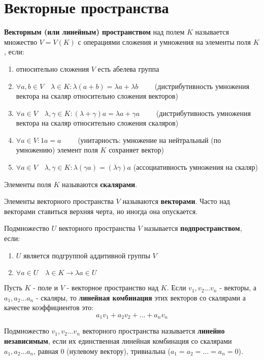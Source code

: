 \texttt{}\section{Векторные пространства}
\textbf{Векторным (или линейным) пространством} над полем $K$ называется множество $V = V(K)$ с операциями сложения и умножения на элементы поля $K$, если:
\begin{enumerate}
	\item относительно сложения $V$ есть абелева группа
	\item $\forall a, b \in V \quad \lambda \in K : \lambda(a + b) = \lambda a + \lambda b \qquad$ (дистрибутивность умножения вектора на скаляр относительно сложения векторов)
	\item $\forall a \in V \quad \lambda, \gamma \in K : (\lambda + \gamma)a = \lambda a + \gamma a \qquad$ (дистрибутивность умножения вектора на скаляр относительно сложения скаляров)
	\item $\forall a \in V : 1a = a \qquad$ (унитарность: умножение на нейтральный (по умножению) элемент поля $K$ сохраняет вектор)
	\item  $\forall a \in V \quad \lambda, \gamma \in K : \lambda (\gamma a) = (\lambda \gamma) a$  (ассоциативность умножения на скаляр)
\end{enumerate}

Элементы поля $K$ называются \textbf{скалярами}.

Элементы векторного пространства $V$ называются \textbf{векторами}. Часто над векторами ставиться верхняя черта, но иногда она опускается.

Подмножество $U$ векторного пространства $V$ называется \textbf{подпространством}, если:
\begin{enumerate}
	\item $U$ является подгруппой аддитивной группы $V$
	\item $\forall a \in U \quad \lambda \in K \rightarrow \lambda a \in U$
\end{enumerate}

Пусть $K$ - поле и $V$ - векторное пространство над $K$. Если $v_1, v_2 \ldots v_n$ - векторы, а $a_1, a_2 \ldots a_n$ - скаляры, то \textbf{линейная комбинация} этих векторов со скалярами а качестве коэффициентов это:
$$
a_1 v_1 + a_2 v_2 + \ldots + a_n v_n
$$ 

Подмножество $v_1, v_2 \ldots v_n$ векторного пространства называется \textbf{линейно независимым}, если их единственная линейная комбинация со скалярами $a_1, a_2 \ldots a_n$, равная 0 (нулевому вектору), тривиальна ($a_1 = a_2 = \ldots = a_n = 0$).

